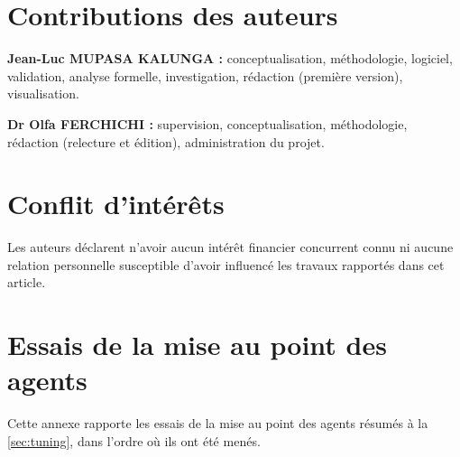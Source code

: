\documentclass[11pt,a4paper]{article}
\newif\ifrevmarks
\newif\ifcorrmarks
\newcommand{\corr}[1]{\ifcorrmarks\textcolor{corrcolor}{#1}\else#1\fi}
\newcommand{\adir}[1]{\ifrevmarks\textcolor{violet}{\textbf{[À VALIDER AVEC LA DIRECTRICE : #1]}}\fi}
\begin{document}
\section*{Contributions des auteurs}

\textbf{Jean-Luc MUPASA KALUNGA :} conceptualisation, méthodologie, logiciel, validation, analyse formelle, investigation, rédaction (première version), visualisation.

\textbf{Dr Olfa FERCHICHI :} supervision, conceptualisation, méthodologie, rédaction (relecture et édition), administration du projet.

\section*{Conflit d'intérêts}

Les auteurs déclarent n'avoir aucun intérêt financier concurrent connu ni aucune relation personnelle susceptible d'avoir influencé les travaux rapportés dans cet article.




\adir{style bibliographique : utiliser le modèle de la revue cible (sn-jnl pour Springer) ; corriger les entrées de \texttt{RL\_references.bib} signalées dans le rapport de relecture (section 5.4).}

\appendix
\section{Essais de la mise au point des agents}
\label{app:tuning}

\corr{Cette annexe rapporte les essais de la mise au point des agents résumés à la \cref{sec:tuning}, dans l'ordre où ils ont été menés.}
\end{document}
